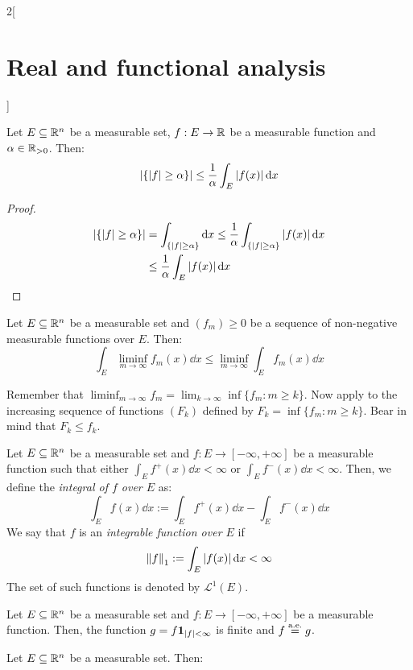 \documentclass[../../../main_math.tex]{subfiles}
\begin{document}
\begin{multicols}{2}[\section{Real and functional analysis}]
\begin{sproof}
  \end{sproof}
  \begin{theorem}
    Let $E\subseteq\mathbb{R}^n$ be a measurable set, $f:E\rightarrow\mathbb{R}$ be a measurable function and $\alpha\in\mathbb{R}_{>0}$. Then: $$\m{\{\abs{f}\geq\alpha\}}\leq\frac{1}{\alpha}\int_E \abs{f(x)}\dd{x}$$
  \end{theorem}
  \begin{proof}
    \begin{align*}
      \m{\{\abs{f}\geq\alpha\}} & =\int_{\{\abs{f}\geq\alpha\}}\dd{x}\leq\frac{1}{\alpha}\int_{\{\abs{f}\geq\alpha\}} \abs{f(x)}\dd{x} \\
                                & \leq\frac{1}{\alpha}\int_E \abs{f(x)}\dd{x}
    \end{align*}
  \end{proof}
  \begin{lemma}
    Let $E\subseteq\mathbb{R}^n$ be a measurable set and $(f_m)\geq 0$ be a sequence of non-negative measurable functions over $E$. Then: $$\int_E\liminf_{m\to\infty}f_m(x)\dd{x}\leq \liminf_{m\to\infty}\int_Ef_m(x)\dd{x}$$
  \end{lemma}
  \begin{sproof}
    Remember that $\displaystyle\liminf_{m\to\infty} f_m=\lim_{k\to\infty}\inf\{f_m:m\geq k\}$. Now apply  to the increasing sequence of functions $(F_k)$ defined by $F_k=\inf\{f_m:m\geq k\}$. Bear in mind that $F_k\leq f_k$.
  \end{sproof}
  \begin{definition}
    Let $E\subseteq\mathbb{R}^n$ be a measurable set and $f:E\rightarrow[-\infty,+\infty]$ be a measurable function such that either $\int_Ef^+(x)\dd{x}<\infty$ or $\int_Ef^-(x)\dd{x}<\infty$. Then, we define the \emph{integral of $f$ over $E$} as: $$\int_Ef(x)\dd{x}:=\int_Ef^+(x)\dd{x}-\int_Ef^-(x)\dd{x}$$
    We say that $f$ is an \emph{integrable function over $E$} if $${\left\|f\right\|}_1:=\int_E\abs{f(x)}\dd{x}<\infty$$ The set of such functions is denoted by $ \mathcal{L}^1(E)$.
  \end{definition}
  \begin{proposition}
    Let $E\subseteq\mathbb{R}^n$ be a measurable set and $f:E\rightarrow[-\infty,+\infty]$ be a measurable function. Then, the function $g=f\boldsymbol{\mathrm{1}}_{\abs{f}<\infty}$ is finite and $f\overset{\text{a.e.}}{=}g$.
  \end{proposition}
  \begin{proposition}
    Let $E\subseteq\mathbb{R}^n$ be a measurable set. Then:
    \begin{enumerate}

\end{enumerate}
\end{proposition}
\end{multicols}
\end{document}
